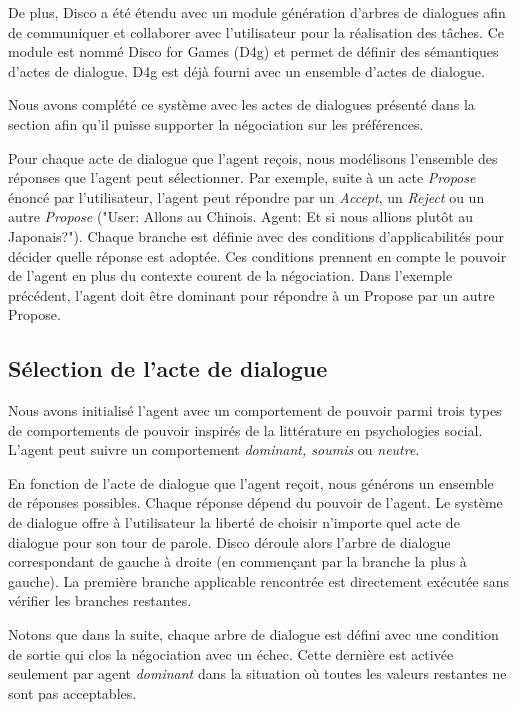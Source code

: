 	De plus, Disco a été étendu avec un module génération d'arbres de dialogues afin de communiquer et collaborer avec l'utilisateur pour la réalisation des tâches. Ce module est nommé Disco for Games (D4g) et permet de définir des sémantiques d'actes de dialogue. D4g est déjà fourni avec un ensemble d'actes de dialogue.
	
	Nous avons complété ce système avec les actes de dialogues présenté dans la section \label{sec:communication} afin qu'il puisse supporter la négociation sur les préférences.
	
	Pour chaque acte de dialogue que l'agent reçois, nous modélisons l'ensemble des réponses que l'agent peut sélectionner. Par exemple, suite à un acte \emph{Propose} énoncé par l'utilisateur, l'agent peut répondre par un \emph{Accept}, un \emph{Reject} ou un autre \emph{Propose} ("User: Allons au Chinois. Agent: Et si nous allions plutôt au Japonais?"). 
	Chaque branche est définie avec des conditions d'applicabilités pour décider quelle réponse est adoptée. 
	Ces conditions prennent en compte le pouvoir de l'agent en plus du contexte courent de la négociation. Dans l'exemple précédent, l'agent doit être dominant pour répondre à un Propose par un autre Propose. 
	
	

	
	\subsection{Sélection de l'acte de dialogue}
		Nous avons initialisé l'agent avec un comportement de pouvoir parmi trois types de comportements de pouvoir inspirés de la littérature en psychologies social.  L'agent peut suivre un comportement \emph{dominant, soumis} ou \emph{neutre}. 
		
		En fonction de l'acte de dialogue que l'agent reçoit, nous générons un ensemble de réponses possibles. Chaque réponse dépend du pouvoir de l'agent. Le système de dialogue offre à l'utilisateur la liberté de choisir n'importe quel acte de dialogue pour son tour de parole. Disco déroule alors l'arbre de dialogue correspondant de gauche à droite (en commençant par la branche la plus à gauche). La première branche applicable rencontrée est directement exécutée sans vérifier les branches restantes.
		
		Notons que dans la suite, chaque arbre de dialogue est défini avec une condition de sortie qui clos la négociation avec un échec. Cette dernière est activée seulement par agent \emph{dominant} dans la situation où toutes les valeurs restantes ne sont pas acceptables. 
		
